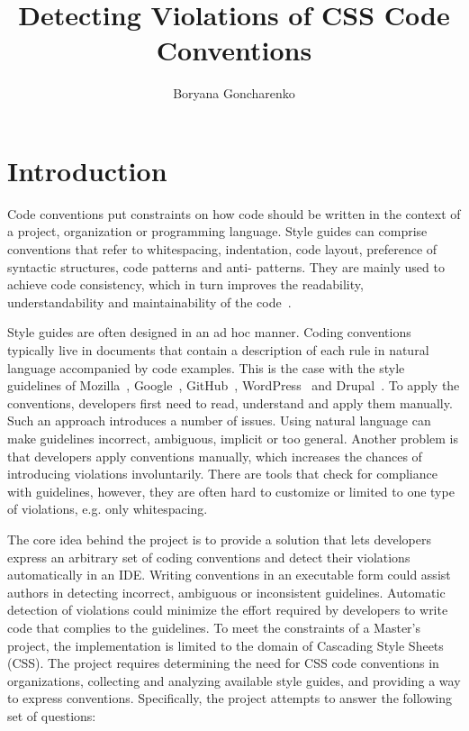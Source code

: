 \documentclass[parskip=full]{uvamscse}
\title{Detecting Violations of CSS Code Conventions}
\author{Boryana Goncharenko}
\begin{document}
\maketitle

\chapter{Introduction}

Code conventions put constraints on how code should be written in the context of a project,
organization or programming language. Style guides can comprise conventions that refer to
whitespacing, indentation, code layout, preference of syntactic structures, code patterns and anti-
patterns. They are mainly used to achieve code consistency, which in turn improves the readability,
understandability and maintainability of the code~\cite{Buse2010}.

Style guides are often designed in an ad hoc manner. Coding conventions typically live in documents
that contain a description of each rule in natural language accompanied by code examples. This is
the case with the style guidelines of Mozilla~\cite{Mozilla}, Google~\cite{Google}, GitHub~\cite{GitHub}, WordPress~\cite{Wordpress} and
Drupal~\cite{Drupal}. To apply the conventions, developers first need to read, understand and apply them
manually. Such an approach introduces a number of issues. Using natural language can make guidelines
incorrect, ambiguous, implicit or too general. Another problem is that developers apply conventions
manually, which increases the chances of introducing violations involuntarily. There are tools that
check for compliance with guidelines, however, they are often hard to customize or limited to one
type of violations, e.g. only whitespacing.

The core idea behind the project is to provide a solution that lets developers express an arbitrary
set of coding conventions and detect their violations automatically in an IDE. Writing conventions
in an executable form could assist authors in detecting incorrect, ambiguous or inconsistent
guidelines. Automatic detection of violations could minimize the effort required by developers to
write code that complies to the guidelines. To meet the constraints of a Master’s project, the
implementation is limited to the domain of Cascading Style Sheets (CSS). The project requires
determining the need for CSS code conventions in organizations, collecting and analyzing available
style guides, and providing a way to express conventions. Specifically, the project attempts to
answer the following set of questions:
\end{document}
